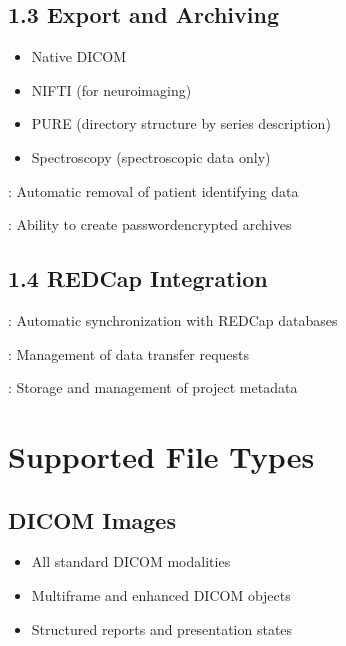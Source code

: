 \documentclass[letterpaper,10pt,english]{sphinxmanual}
\begin{document}
\subsection{1.3 Export and Archiving}
\label{\detokenize{Temp/end-user-options:export-and-archiving}}\begin{description}
\begin{itemize}
\item {} 
\sphinxAtStartPar
Native DICOM

\item {} 
\sphinxAtStartPar
NIFTI (for neuroimaging)

\item {} 
\sphinxAtStartPar
PURE (directory structure by series description)

\item {} 
\sphinxAtStartPar
Spectroscopy (spectroscopic data only)

\end{itemize}

\end{description}

\sphinxAtStartPar
{}: Automatic removal of patient identifying data

\sphinxAtStartPar
{}: Ability to create password\sphinxhyphen{}encrypted archives


\subsection{1.4 REDCap Integration}
\label{\detokenize{Temp/end-user-options:redcap-integration}}
\sphinxAtStartPar
{}: Automatic synchronization with REDCap databases

\sphinxAtStartPar
{}: Management of data transfer requests

\sphinxAtStartPar
{}: Storage and management of project metadata


\section{Supported File Types}
\label{\detokenize{Temp/end-user-options:supported-file-types}}

\subsection{DICOM Images}
\label{\detokenize{Temp/end-user-options:dicom-images}}\begin{itemize}
\item {} 
\sphinxAtStartPar
All standard DICOM modalities

\item {} 
\sphinxAtStartPar
Multi\sphinxhyphen{}frame and enhanced DICOM objects

\item {} 
\sphinxAtStartPar
Structured reports and presentation states

\end{itemize}
\end{document}

